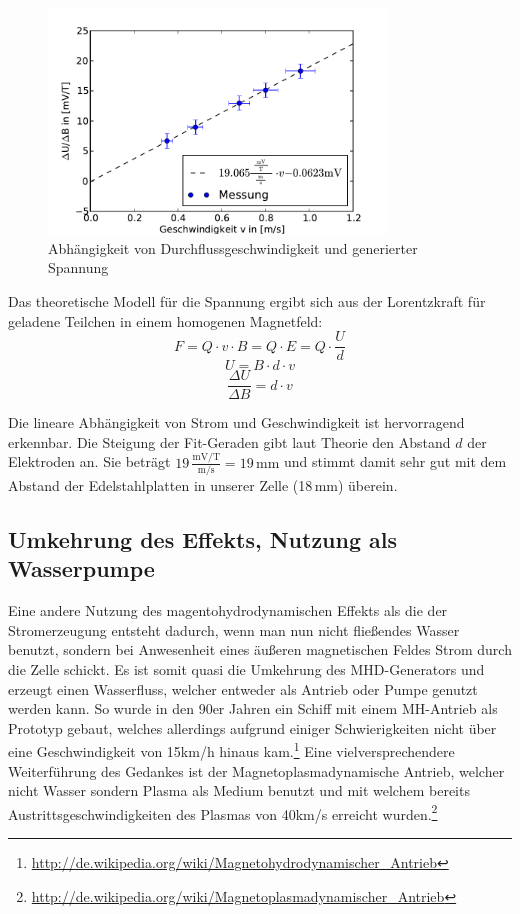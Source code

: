 \documentclass[11pt]{scrartcl}
\newcommand{\unit}[1]{\ensuremath{\,\mathrm{#1}}} %
\begin{document}
\begin{figure}[ht]
\begin{center}
\includegraphics[width=0.8\textwidth]{images/v-U.pdf}
\end{center}
\vspace{-1.5\baselineskip}
\caption{Abhängigkeit von Durchflussgeschwindigkeit und generierter Spannung}
\label{v-U}
\end{figure}

Das theoretische Modell für die Spannung ergibt sich aus der Lorentzkraft für geladene Teilchen in einem homogenen Magnetfeld:
\[
F=Q\cdot v\cdot B = Q \cdot E = Q \cdot \frac{U}{d}
\]
\[
U=B \cdot d \cdot v
\]
\[
\frac{\Delta U}{\Delta B}=d \cdot v
\]

Die lineare Abhängigkeit von Strom und Geschwindigkeit ist hervorragend erkennbar. Die Steigung der Fit-Geraden gibt laut Theorie den Abstand $d$ der Elektroden an. Sie beträgt $19 \unit{\frac{ mV/T }{ m/s }} = 19 \unit{mm}$ und stimmt damit sehr gut mit dem Abstand der Edelstahlplatten in unserer Zelle (18\unit{mm}) überein.


\subsection{Umkehrung des Effekts, Nutzung als Wasserpumpe}		%

Eine andere Nutzung des magentohydrodynamischen Effekts als die der Stromerzeugung entsteht dadurch, wenn man nun nicht fließendes Wasser benutzt, sondern bei Anwesenheit eines äußeren magnetischen Feldes Strom durch die Zelle schickt. Es ist somit quasi die Umkehrung des MHD-Generators und erzeugt einen Wasserfluss, welcher entweder als Antrieb oder Pumpe genutzt werden kann. So wurde in den 90er Jahren ein Schiff mit einem MH-Antrieb als Prototyp gebaut, welches allerdings aufgrund einiger Schwierigkeiten nicht über eine Geschwindigkeit von 15km/h hinaus kam.\footnote{\url{http://de.wikipedia.org/wiki/Magnetohydrodynamischer\_Antrieb}} Eine vielversprechendere Weiterführung des Gedankes ist der Magnetoplasmadynamische Antrieb, welcher nicht Wasser sondern Plasma als Medium benutzt und mit welchem bereits Austrittsgeschwindigkeiten des Plasmas von 40km/s erreicht wurden.\footnote{\url{http://de.wikipedia.org/wiki/Magnetoplasmadynamischer\_Antrieb}}
\end{document}
